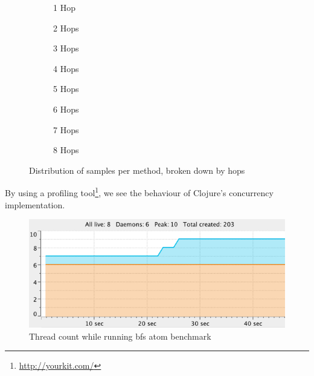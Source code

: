 				\begin{figure}
					\begin{subfigure}[b]{.5\linewidth}
						
						\caption{1 Hop}
						\label{subfig:1-hop}
					\end{subfigure}
					\begin{subfigure}[b]{.5\linewidth}
						
						\caption{2 Hops}
						\label{subfig:2-hops}
					\end{subfigure}
					\begin{subfigure}[b]{.5\linewidth}
						
						\caption{3 Hops}
						\label{subfig:3-hops}
					\end{subfigure}
					\begin{subfigure}[b]{.5\linewidth}
						
						\caption{4 Hops}
						\label{subfig:4-hops}
					\end{subfigure}
					\begin{subfigure}[b]{.5\linewidth}
						
						\caption{5 Hops}
						\label{subfig:5-hops}
					\end{subfigure}
					\begin{subfigure}[b]{.5\linewidth}
						
						\caption{6 Hops}
						\label{subfig:6-hops}
					\end{subfigure}
					\begin{subfigure}[b]{.5\linewidth}
						
						\caption{7 Hops}
						\label{subfig:7-hops}
					\end{subfigure}
					\begin{subfigure}[b]{.5\linewidth}
						
						\caption{8 Hops}
						\label{subfig:8-hops}
					\end{subfigure}
					
					\caption{Distribution of samples per method, broken down by hops}
					\label{fig:distribution-hops}
				\end{figure}
				
				By using a profiling tool\footnote{\url{http://yourkit.com/}}, we see the behaviour of Clojure's concurrency implementation.
				
				\begin{figure}
					\centering
					
					\includegraphics{figures/images/threads}
					
					\caption{Thread count while running \gls{bfs} atom benchmark}
					\label{fig:runtime-threads}
				\end{figure}
				
